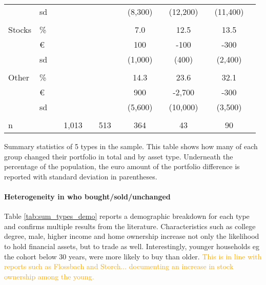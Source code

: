 \documentclass[ProjectABM]{subfiles}
\begin{document}
\begin{table}[]
{\begin{threeparttable}
\begin{tabular}{ll|ccccccccccc}
				& sd &  &  &  &  &  & (8,300) &  & (12,200) &  & (11,400) &  \\
				&  &  &  &  &  &  &  &  &  &  &  &  \\
				Stocks & \% &  &  &  &  &  & 7.0 &  & 12.5 &  & 13.5 &  \\
				& \euro &  &  &  &  &  & 100 &  & -100 &  & -300 &  \\
				& sd &  &  &  &  &  & (1,000) &  & (400) &  & (2,400) &  \\
				&  &  &  &  &  &  &  &  &  &  &  &  \\
				Other & \% &  &  &  &  &  & 14.3 &  & 23.6 &  & 32.1 &  \\
				& \euro &  &  &  &  &  & 900 &  & -2,700 &  & -300 &  \\
				& sd &  &  &  &  &  & (5,600) &  & (10,000) &  & (3,500) &  \\ \hline
				&  &  &  &  &  &  &  &  &  &  &  &  \\
				n &  &  & 1,013 &  & 513 &  & 364 &  & 43 &  & 90 &  \\ \hline \hline
			\end{tabular}
			\begin{tablenotes}\footnotesize
				\item[] Summary statistics of 5 types in the sample. This table shows how many of each group changed their portfolio in total and by asset type. Underneath the percentage of the population, the euro amount of the portfolio difference is reported with standard deviation in parentheses.
			\end{tablenotes}
		\end{threeparttable}
	}
\end{table}

\paragraph{Heterogeneity in who bought/sold/unchanged}
Table \ref{tab:sum_types_demo} reports a demographic breakdown for each type and confirms multiple results from the literature. Characteristics such as college degree, male, higher income and home ownership increase not only the likelihood to hold financial assets, but to trade as well. Interestingly, younger households eg the cohort below 30 years, were more likely to buy than older. \textcolor{orange}{This is in line with reports such as Flossbach and Storch... documenting an increase in stock ownership among the young.}
\end{document}

